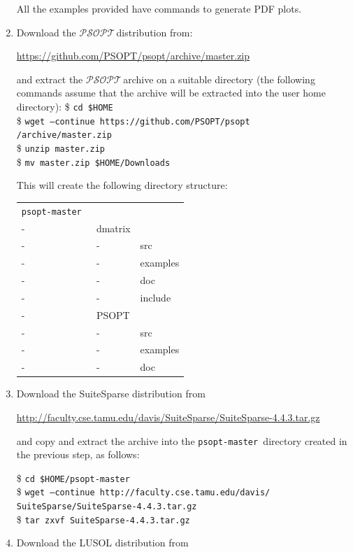 \documentclass[a4paper,11pt]{report}    %
\newcommand{\psopt}{$\mathcal{PSOPT}$\,}  %
\newcommand{\basedir}{\texttt{psopt-master\,}}
\newcommand{\shell}[1]{\$ \texttt{#1}\\}
\newcommand{\shellcont}[1]{\texttt{#1}\\}
\newenvironment{shadedframe}{%
  \def\FrameCommand{\fcolorbox{black}{shadecolor}}%
  \MakeFramed {\FrameRestore}}
{\endMakeFramed}
\begin{document}
\begin{enumerate}
All the examples provided have commands to generate PDF plots. 

\item Download the \psopt distribution from:

\href{https://github.com/PSOPT/psopt/archive/master.zip}{https://github.com/PSOPT/psopt/archive/master.zip}

and extract the \psopt archive on a suitable directory (the following commands assume that the archive will be extracted into the user home directory):
\begin{shadedframe}
\shell{cd \$HOME}
\shell{wget --continue https://github.com/PSOPT/psopt}
\shellcont{/archive/master.zip}
\shell{unzip master.zip}
\shell{mv master.zip \$HOME/Downloads}

\end{shadedframe}

This will create the following directory structure:

\begin{tabular}{lll}
   \basedir \\
    - & dmatrix \\
    - &  -     &  src \\
    - &  -     &  examples\\
    - &  -     &  doc \\
    - &  -     &  include \\
    - & PSOPT \\
    - &  -     &  src \\
    - &  -     &  examples\\
    - &  -     &  doc
\end{tabular}

\item Download the SuiteSparse distribution from

 \href{http://faculty.cse.tamu.edu/davis/SuiteSparse/SuiteSparse-4.4.3.tar.gz}{http://faculty.cse.tamu.edu/davis/SuiteSparse/SuiteSparse-4.4.3.tar.gz}

and copy and extract the archive into the \basedir directory created in the previous step, as follows:

\begin{shadedframe}
\shell{cd \$HOME/psopt-master}
\shell{wget --continue http://faculty.cse.tamu.edu/davis/}
\shellcont{SuiteSparse/SuiteSparse-4.4.3.tar.gz}
\shell{tar zxvf SuiteSparse-4.4.3.tar.gz}
\end{shadedframe}


\item Download the LUSOL distribution from


\end{enumerate}
\end{document}
